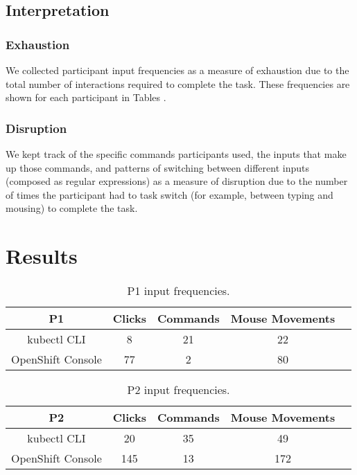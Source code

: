\documentclass[11pt, oneside]{article}   	%
\begin{document}
\subsection{Interpretation}
\subsubsection{Exhaustion}
We collected participant input frequencies as a measure of exhaustion due to the total number of interactions required to complete the task. These frequencies are shown for each participant in Tables \text{\ref{table:t1}--\ref{table:t4}}.
\subsubsection{Disruption}
We kept track of the specific commands participants used, the inputs that make up those commands, and patterns of switching between different inputs (composed as regular expressions) as a measure of disruption due to the number of times the participant had to task switch (for example, between typing and mousing) to complete the task. 

\section{Results}

\begin{table}
 \centering
  \begin{tabular}{ | c | c | c | c | c | }
  \hline
  P1 & Clicks & Commands & Mouse Movements \\ 
  \hline
  kubectl CLI & 8 & 21 & 22 \\ 
  \hline
  OpenShift Console & 77 & 2 & 80 \\ 
  \hline
  \end{tabular}
 \caption{P1 input frequencies.}
 \label{table:t1}
\end{table}

\begin{table}
 \centering
  \begin{tabular}{ | c | c | c | c | c | } 
  \hline
  P2 & Clicks & Commands & Mouse Movements \\ 
  \hline
  kubectl CLI & 20 & 35 & 49 \\ 
  \hline
  OpenShift Console & 145 & 13 & 172 \\ 
  \hline
  \end{tabular}
 \caption{P2 input frequencies.}
 \label{table:t2}
\end{table}
\end{document}
